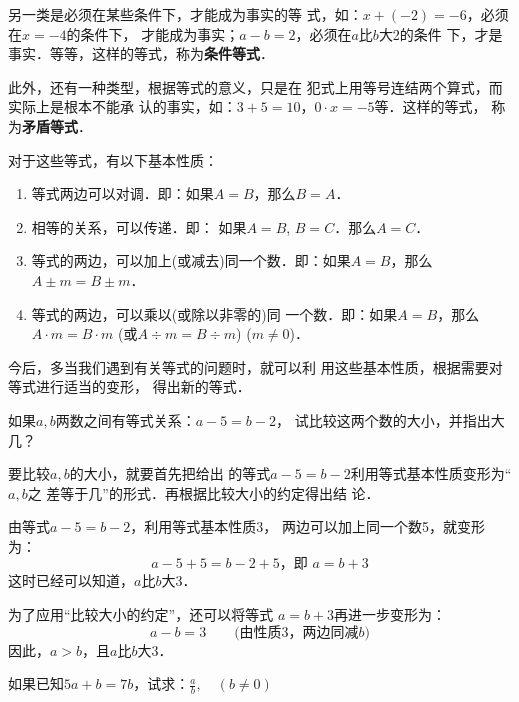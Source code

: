 另一类是必须在某些条件下，才能成为事实的等
式，如：$x+(-2)=-6$，必须在$x=-4$的条件下，
才能成为事实；$a-b=2$，必须在$a$比$b$大2的条件
下，才是事实．等等，这样的等式，称为\textbf{条件等式}．

此外，还有一种类型，根据等式的意义，只是在
犯式上用等号连结两个算式，而实际上是根本不能承
认的事实，如：$3+5=10$，$0\cdot x=-5$等．这样的等式，
称为\textbf{矛盾等式}．

对于这些等式，有以下基本性质：

\begin{blk}{}
	\begin{enumerate}
		\item 等式两边可以对调．即：如果$A= B$，那么$B=A$．
		\item 相等的关系，可以传递．即：
		如果$A=B$,  $B=C$．那么$A=C$．
		\item 等式的两边，可以加上(或减去)同一个数．即：如果$A= B$，那么$A\pm m=B\pm m$．
		\item 等式的两边，可以乘以(或除以非零的)同
		一个数．即：如果$A=B$，那么$A\cdot m=B\cdot m$ (或$A\div m =
		B\div m$) ($m\ne 0$)．
	\end{enumerate}
\end{blk}


今后，多当我们遇到有关等式的问题时，就可以利
用这些基本性质，根据需要对等式进行适当的变形，
得出新的等式．

\begin{example}
	如果$a,b$两数之间有等式关系：$a-5=b-2$，
	试比较这两个数的大小，并指出大几？
\end{example}

\begin{analyze}
	要比较$a,b$的大小，就要首先把给出
	的等式$a-5=b-2$利用等式基本性质变形为“$a, b$之
	差等于几”的形式．再根据比较大小的约定得出结
	论．
\end{analyze}

\begin{solution}
	由等式$a-5=b-2$，利用等式基本性质3，
	两边可以加上同一个数5，就变形为：
	\[a-5+5=b-2+5，\text{即 } a=b+3\]
	这时已经可以知道，$a$比$b$大3．
	
	为了应用“比较大小的约定”，还可以将等式
	$a=b+3$再进一步变形为：
	\[a-b=3\qquad \text{(由性质3，两边同减$b$)}\]
	因此，$a>b$，且$a$比$b$大3．
\end{solution}

\begin{example}
	如果已知$5a + b = 7b$，试求：$\frac{a}{b},\quad (b\ne 0)$
\end{example}

